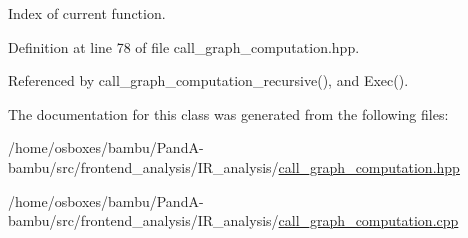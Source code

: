 Index of current function. 



Definition at line 78 of file call\+\_\+graph\+\_\+computation.\+hpp.



Referenced by call\+\_\+graph\+\_\+computation\+\_\+recursive(), and Exec().



The documentation for this class was generated from the following files\+:\begin{DoxyCompactItemize}
\item 
/home/osboxes/bambu/\+Pand\+A-\/bambu/src/frontend\+\_\+analysis/\+I\+R\+\_\+analysis/\hyperlink{call__graph__computation_8hpp}{call\+\_\+graph\+\_\+computation.\+hpp}\item 
/home/osboxes/bambu/\+Pand\+A-\/bambu/src/frontend\+\_\+analysis/\+I\+R\+\_\+analysis/\hyperlink{call__graph__computation_8cpp}{call\+\_\+graph\+\_\+computation.\+cpp}\end{DoxyCompactItemize}
